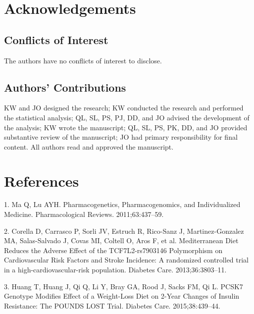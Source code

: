 \documentclass[]{article}
\begin{document}
\hypertarget{acknowledgements}{%
\section{Acknowledgements}\label{acknowledgements}}

\hypertarget{conflicts-of-interest}{%
\subsection{Conflicts of Interest}\label{conflicts-of-interest}}

The authors have no conflicts of interest to disclose.

\hypertarget{authors-contributions}{%
\subsection{Authors' Contributions}\label{authors-contributions}}

KW and JO designed the research; KW conducted the research and performed
the statistical analysis; QL, SL, PS, PJ, DD, and JO advised the
development of the analysis; KW wrote the manuscript; QL, SL, PS, PK,
DD, and JO provided substantive review of the manuscript; JO had primary
responsibility for final content. All authors read and approved the
manuscript.

\hypertarget{references}{%
\section*{References}\label{references}}

\hypertarget{refs}{}
\leavevmode\hypertarget{ref-Ma2011}{}%
1. Ma Q, Lu AYH. Pharmacogenetics, Pharmacogenomics, and Individualized
Medicine. Pharmacological Reviews. 2011;63:437--59.

\leavevmode\hypertarget{ref-Corella2013}{}%
2. Corella D, Carrasco P, Sorli JV, Estruch R, Rico-Sanz J,
Martinez-Gonzalez MA, Salas-Salvado J, Covas MI, Coltell O, Aros F, et
al. Mediterranean Diet Reduces the Adverse Effect of the
TCF7L2-rs7903146 Polymorphism on Cardiovascular Risk Factors and Stroke
Incidence: A randomized controlled trial in a high-cardiovascular-risk
population. Diabetes Care. 2013;36:3803--11.

\leavevmode\hypertarget{ref-Huang2015}{}%
3. Huang T, Huang J, Qi Q, Li Y, Bray GA, Rood J, Sacks FM, Qi L. PCSK7
Genotype Modifies Effect of a Weight-Loss Diet on 2-Year Changes of
Insulin Resistance: The POUNDS LOST Trial. Diabetes Care.
2015;38:439--44.
\end{document}
